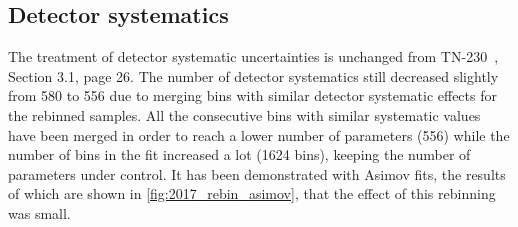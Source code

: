 \subsection{Detector systematics}
\label{subsec:ND280:syst:flux}
The treatment of detector systematic uncertainties is unchanged from TN-230~\cite{tn_230}, Section 3.1, page 26.
The number of detector systematics still decreased slightly from 580 to 556 due to merging bins with similar detector systematic effects for the rebinned samples.
All the consecutive bins with similar systematic values have been merged in order to reach a lower number of parameters (556) while the number of bins in the fit increased a lot (1624 bins), keeping the number of parameters under control.
It has been demonstrated with Asimov fits, the results of which are shown in \autoref{fig:2017_rebin_asimov}, that the effect of this rebinning was small.

